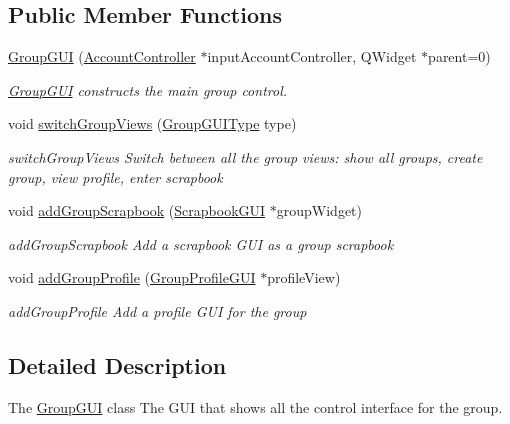 \subsection*{Public Member Functions}
\begin{DoxyCompactItemize}
\item 
\hyperlink{classGroupGUI_acfc284ab86c90b70735c59b4a3944979}{Group\+G\+UI} (\hyperlink{classAccountController}{Account\+Controller} $\ast$input\+Account\+Controller, Q\+Widget $\ast$parent=0)
\begin{DoxyCompactList}\small\item\em \hyperlink{classGroupGUI}{Group\+G\+UI} constructs the main group control. \end{DoxyCompactList}\item 
void \hyperlink{classGroupGUI_a259227f76695aca072e4cc6c5801a4e7}{switch\+Group\+Views} (\hyperlink{classGroupGUI_a07cb130b553bc270c1debf317cfa1cf8}{Group\+G\+U\+I\+Type} type)
\begin{DoxyCompactList}\small\item\em switch\+Group\+Views Switch between all the group views\+: show all groups, create group, view profile, enter scrapbook \end{DoxyCompactList}\item 
void \hyperlink{classGroupGUI_a3aec97c7ea8c53451b8e89e78b69c2ca}{add\+Group\+Scrapbook} (\hyperlink{classScrapbookGUI}{Scrapbook\+G\+UI} $\ast$group\+Widget)
\begin{DoxyCompactList}\small\item\em add\+Group\+Scrapbook Add a scrapbook G\+UI as a group scrapbook \end{DoxyCompactList}\item 
void \hyperlink{classGroupGUI_a641a3dbe4cbf8e67f3b78247cc88a38a}{add\+Group\+Profile} (\hyperlink{classGroupProfileGUI}{Group\+Profile\+G\+UI} $\ast$profile\+View)
\begin{DoxyCompactList}\small\item\em add\+Group\+Profile Add a profile G\+UI for the group \end{DoxyCompactList}\end{DoxyCompactItemize}


\subsection{Detailed Description}
The \hyperlink{classGroupGUI}{Group\+G\+UI} class The G\+UI that shows all the control interface for the group. 

